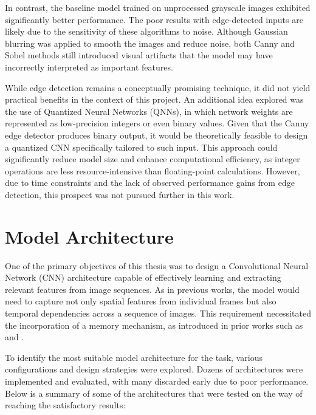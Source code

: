 In contrast, the baseline model trained on unprocessed grayscale images exhibited significantly better performance. The poor results with edge-detected inputs are likely due to the sensitivity of these algorithms to noise. Although Gaussian blurring was applied to smooth the images and reduce noise, both Canny and Sobel methods still introduced visual artifacts that the model may have incorrectly interpreted as important features.

While edge detection remains a conceptually promising technique, it did not yield practical benefits in the context of this project. An additional idea explored was the use of Quantized Neural Networks (QNNs), in which network weights are represented as low-precision integers or even binary values. Given that the Canny edge detector produces binary output, it would be theoretically feasible to design a quantized CNN specifically tailored to such input. This approach could significantly reduce model size and enhance computational efficiency, as integer operations are less resource-intensive than floating-point calculations. However, due to time constraints and the lack of observed performance gains from edge detection, this prospect was not pursued further in this work.

\section{Model Architecture}

One of the primary objectives of this thesis was to design a Convolutional Neural Network (CNN) architecture capable of effectively learning and extracting relevant features from image sequences. As in previous works, the model would need to capture not only spatial features from individual frames but also temporal dependencies across a sequence of images. This requirement necessitated the incorporation of a memory mechanism, as introduced in prior works such as \autocite{schneeberger2024end} and \autocite{schaller2023train}.

To identify the most suitable model architecture for the task, various configurations and design strategies were explored. Dozens of architectures were implemented and evaluated, with many discarded early due to poor performance. Below is a summary of some of the architectures that were tested on the way of reaching the satisfactory results:

